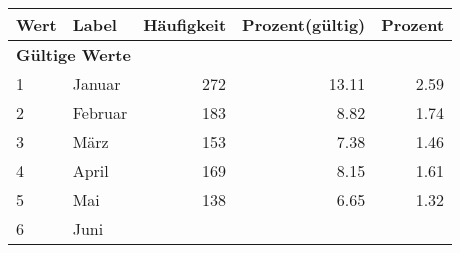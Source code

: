      \begin{longtable}{lXrrr}
     \toprule
     \textbf{Wert} & \textbf{Label} & \textbf{Häufigkeit} & \textbf{Prozent(gültig)} & \textbf{Prozent} \\
     \endhead
     \midrule
     \multicolumn{5}{l}{\textbf{Gültige Werte}}\\

     1 &
     \multicolumn{1}{X}{ Januar   } &


       \num{272} &
       \num[round-mode=places,round-precision=2]{13.11} &
         \num[round-mode=places,round-precision=2]{2.59} \\

     2 &
     \multicolumn{1}{X}{ Februar   } &


       \num{183} &
       \num[round-mode=places,round-precision=2]{8.82} &
         \num[round-mode=places,round-precision=2]{1.74} \\

     3 &
     \multicolumn{1}{X}{ März   } &


       \num{153} &
       \num[round-mode=places,round-precision=2]{7.38} &
         \num[round-mode=places,round-precision=2]{1.46} \\

     4 &
     \multicolumn{1}{X}{ April   } &


       \num{169} &
       \num[round-mode=places,round-precision=2]{8.15} &
         \num[round-mode=places,round-precision=2]{1.61} \\

     5 &
     \multicolumn{1}{X}{ Mai   } &


       \num{138} &
       \num[round-mode=places,round-precision=2]{6.65} &
         \num[round-mode=places,round-precision=2]{1.32} \\

     6 &
     \multicolumn{1}{X}{ Juni   } &



\end{longtable}
